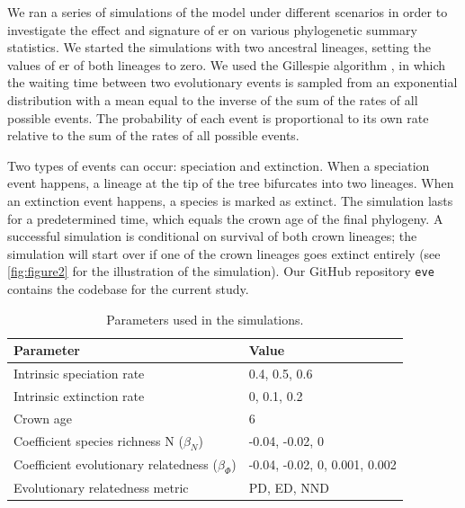 {We ran a series of simulations of the model under different scenarios in order to investigate the effect and signature of \acrshort{er} on various phylogenetic summary statistics. We started the simulations with two ancestral lineages, setting the values of \acrshort{er} of both lineages to zero. We used the Gillespie algorithm \citep{gillespie_general_1976}, in which the waiting time between two evolutionary events is sampled from an exponential distribution with a mean equal to the inverse of the sum of the rates of all possible events. The probability of each event is proportional to its own rate relative to the sum of the rates of all possible events. 

Two types of events can occur: speciation and extinction. When a speciation event happens, a lineage at the tip of the tree bifurcates into two lineages. When an extinction event happens, a species is marked as extinct. The simulation lasts for a predetermined time, which equals the crown age of the final phylogeny. A successful simulation is conditional on survival of both crown lineages; the simulation will start over if one of the crown lineages goes extinct entirely (see \autoref{fig:figure2} for the illustration of the simulation). Our GitHub repository \texttt{eve} \citep{qin_eve_2023} contains the codebase for the current study.

\begin{table}   
        \caption{Parameters used in the simulations.}
        \begin{tabular}{@{}ll@{}}
        \toprule
        \textbf{Parameter}                   & \textbf{Value}                \\ \midrule
        Intrinsic speciation rate          & 0.4, 0.5, 0.6                 \\
        Intrinsic extinction rate          & 0, 0.1, 0.2                   \\
        Crown age                            & 6                             \\
        Coefficient species richness N ($\beta_N$)      & -0.04, -0.02, 0               \\
        Coefficient evolutionary relatedness ($\beta_\varPhi$) & -0.04, -0.02, 0, 0.001, 0.002 \\
        Evolutionary relatedness metric      & PD, ED, NND                   \\ \bottomrule
        \end{tabular}
    \label{tab:table1}
\end{table}

}
